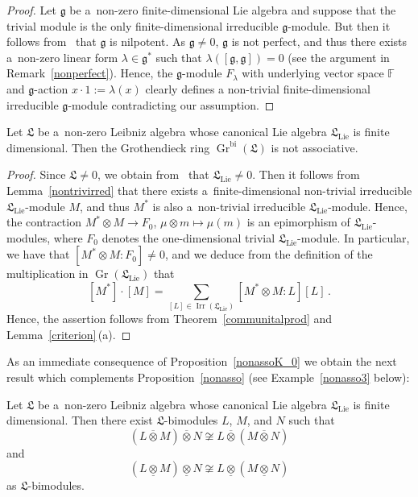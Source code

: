 \documentclass{jonasart}
\DeclareMathOperator{\bi}{bi}
\DeclareMathOperator{\irr}{Irr}
\DeclareMathOperator{\K}{Gr}
\DeclareMathOperator{\lie}{Lie}
\newcommand{\fbb}{\mathbb{F}}
\newcommand{\gf}{\mathfrak{g}}
\newcommand{\lf}{\mathfrak{L}}
\newcommand{\ovo}{\overline{\otimes}}
\newcommand{\und}{\underline{\otimes}}
\begin{document}
	\begin{proof}
		Let $\gf$ be a~non-zero finite-dimensional Lie algebra and suppose that the trivial module is the only finite-dimensional irreducible $\gf$-module. But then it follows from~\cite[Proposition 1]{F0} that $\gf$ is nilpotent. As $\gf\ne 0$,
		$\gf$ is not perfect, and thus there exists a~non-zero linear form $\lambda
		\in\gf^*$ such that $\lambda([\gf,\gf])=0$ (see the argument in Remark~\ref{nonperfect}). Hence, the $\gf$-module $F_\lambda$ with underlying vector space $\fbb$ and $\gf$-action $x\cdot 1:=\lambda(x)$ clearly defines a non-trivial finite-dimensional irreducible $\gf$-module contradicting our assumption.
	\end{proof}

	\begin{proposition}\label{nonassoK_0}
		Let $\lf$ be a~non-zero Leibniz algebra whose canonical Lie algebra
		$\lf_{\lie}$ is finite dimensional. Then the Grothendieck ring $\K^{\bi}(\lf)$ is not associative.
	\end{proposition}

	\begin{proof}
		Since $\lf\ne 0$, we obtain from~\cite[Proposition 2.20]{F1}
		that $\lf_{\lie}\ne 0$. Then it follows from Lemma~\ref{nontrivirred} that there exists a~finite-dimensional non-trivial irreducible $\lf_{\lie}$-module $M$, and thus $M^*$ is also a~non-trivial irreducible $\lf_{\lie}$-module. Hence, the contraction $M^*\otimes M\to F_0$, $\mu\otimes m\mapsto\mu(m)$ is an epimorphism of $\lf_{\lie}$-modules, where $F_0$ denotes the one-dimensional trivial $\lf_{\lie}$-module. In particular, we have that $[M^*\otimes M:F_0 ]\ne
		0$, and we deduce from the definition of the multiplication in $\K(\lf_{\lie})$
		that
		\[
			[M^* ]
			\cdot[M]=\sum_{[L]\in\irr(\lf_{\lie})}[M^*\otimes M:L][L]\,.
		\]
		Hence, the assertion follows from Theorem~\ref{communitalprod}
		and Lemma~\ref{criterion}\,(a).
	\end{proof}

	As an immediate consequence of Proposition~\ref{nonassoK_0} we obtain the next result which complements Proposition~\ref{nonasso} (see Example~\ref{nonasso3} below):
	\begin{corollary}\label{nonasso2}
		Let $\lf$ be a~non-zero Leibniz algebra whose canonical Lie algebra
		$\lf_{\lie}$ is finite dimensional. Then there exist
		$\lf$-bimodules $L$, $M$, and $N$ such that
		\[
			(L\ovo M)\ovo N\not\cong L\ovo(M\ovo N)
		\]
		and
		\[
			(L\und M)\und N\not\cong L\und(M\und N)
		\]
		as $\lf$-bimodules.
	\end{corollary}
\end{document}
